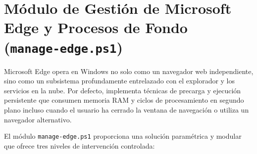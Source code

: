 \documentclass[12pt,a4paper]{report}
\begin{document}
\section[Módulo de Gestión de Microsoft Edge]{Módulo de Gestión de Microsoft Edge y Procesos de Fondo\\ \large(\texttt{manage-edge.ps1})}
Microsoft Edge opera en Windows no solo como un navegador web independiente, sino como un subsistema profundamente entrelazado con el explorador y los servicios en la nube. Por defecto, implementa técnicas de precarga y ejecución persistente que consumen memoria RAM y ciclos de procesamiento en segundo plano incluso cuando el usuario ha cerrado la ventana de navegación o utiliza un navegador alternativo.

El módulo \texttt{manage-edge.ps1} proporciona una solución paramétrica y modular que ofrece tres niveles de intervención controlada:
\end{document}
